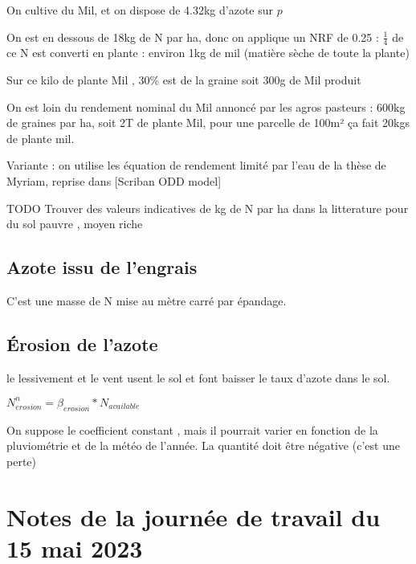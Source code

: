 \documentclass[10pt,a4paper,french]{article} %
\begin{document}
On cultive  du Mil, et on dispose de 4.32kg d'azote sur $p$

On est en dessous de 18kg de N par ha, donc on applique un NRF de 0.25 : $\frac{1}{4}$ de ce N est converti en plante : environ 1kg de mil (matière sèche de toute la plante)

Sur ce kilo de plante Mil , 30\% est de la graine soit 300g de Mil produit

On est loin du rendement nominal du Mil annoncé par les agros pasteurs : 600kg de graines par ha, soit 2T de plante Mil, pour une parcelle de 100m² ça fait 20kgs de plante mil.  





Variante : on utilise les équation de rendement limité par l'eau de la thèse de Myriam, reprise dans [Scriban ODD model]




TODO Trouver des valeurs indicatives de kg de N par ha dans la litterature pour du sol pauvre , moyen riche 



\subsection{Azote issu de l'engrais}


C'est une masse de N mise au mètre carré par épandage.


\subsection{Érosion de l'azote}

le lessivement et  le vent usent le sol et font baisser le taux d'azote dans le sol. 

$N_{erosion}^n = \beta_{erosion}* N_{available}$


On suppose le coefficient constant , mais il pourrait varier en fonction de la pluviométrie et de la météo de l'année.
La quantité doit être négative (c'est une perte) 




\section{Notes de la journée de travail du 15 mai 2023}
\end{document}

